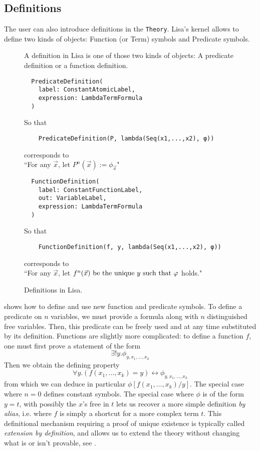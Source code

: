 \subsection{Definitions}
\label{subsec:definitions}
The user can also introduce definitions in the \lstinline|Theory|{}.
Lisa's kernel allows to define two kinds of objects: Function (or Term) symbols and Predicate symbols.

\begin{figure}
  A definition in Lisa is one of those two kinds of objects: A predicate definition or a function definition.
  \begin{lstlisting}
  PredicateDefinition(
    label: ConstantAtomicLabel,
    expression: LambdaTermFormula
  )
\end{lstlisting}
  So that
  \begin{lstlisting}
    PredicateDefinition(P, lambda(Seq(x1,...,x2), φ))
  \end{lstlisting}
  corresponds to \\
  \hspace*{1.3em}``For any $\vec{x}$, let $P^n(\vec{x}) := \phi_{\vec{x}}$"

  \vspace*{2em}
  \begin{lstlisting}
  FunctionDefinition(
    label: ConstantFunctionLabel,
    out: VariableLabel,
    expression: LambdaTermFormula
  )
\end{lstlisting}
  So that
  \begin{lstlisting}
    FunctionDefinition(f, y, lambda(Seq(x1,...,x2), φ))
  \end{lstlisting}
  corresponds to \\
  \hspace*{1.3em}``For any $\vec{x}$, let $f^n(\vec{x}) \textnormal{ be the unique } y \textnormal{ such that } \varphi$ holds."

  \caption{Definitions in Lisa.}
  \label{fig:definitions}
\end{figure}

 shows how to define and use new function and predicate symbols. To define a predicate on $n$ variables, we must provide a formula along with $n$ distinguished free variables. Then, this predicate can be freely used and at any time substituted by its definition. Functions are slightly more complicated: to define a function $f$, one must first prove a statement of the form
$$\exists ! y. \phi_{y, x_1,...,x_k}$$
Then we obtain the defining property
$$\forall y. (f(x_1,...,x_k)=y) \leftrightarrow \phi_{y, x_1,...,x_k}$$
from which we can deduce in particular $\phi[f(x_1,...,x_k)/y]$.
The special case where $n=0$ defines constant symbols. The special case where $\phi$ is of the form $y=t$, with possibly the $x$'s free in $t$ lets us recover a more simple definition \textit{by alias}, i.e. where  $f$ is simply a shortcut for a more complex term $t$.
This definitional mechanism requiring a proof of unique existence is typically called \textit{extension by definition}, and allows us to extend the theory without changing what is or isn't provable, see .

